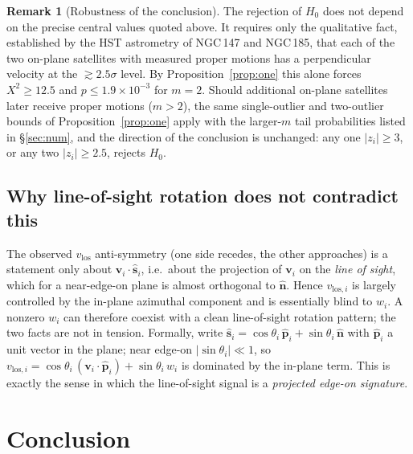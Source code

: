 \documentclass{amsart}
\theoremstyle{definition}
\newtheorem{remark}{Remark}
\begin{document}
\begin{remark}[Robustness of the conclusion]\label{rem:robust}
The rejection of $H_0$ does not depend on the precise central values quoted
above. It requires only the qualitative fact, established by the HST
astrometry of NGC\,147 and NGC\,185, that each of the two on-plane
satellites with measured proper motions has a perpendicular velocity at the
$\gtrsim 2.5\sigma$ level. By Proposition~\ref{prop:one} this alone forces
$X^2\ge 12.5$ and $p\le 1.9\times10^{-3}$ for $m=2$. Should additional
on-plane satellites later receive proper motions ($m>2$), the same
single-outlier and two-outlier bounds of Proposition~\ref{prop:one} apply
with the larger-$m$ tail probabilities listed in \S\ref{sec:num}, and the
direction of the conclusion is unchanged: any one $|z_i|\ge 3$, or any two
$|z_i|\ge 2.5$, rejects $H_0$.
\end{remark}

\subsection{Why line-of-sight rotation does not contradict this}
The observed $v_{\mathrm{los}}$ anti-symmetry (one side recedes, the other
approaches) is a statement only about
$\bm v_i\cdot\hat{\bm s}_i$, i.e.\ about the projection of $\bm v_i$ on the
\emph{line of sight}, which for a near-edge-on plane is almost orthogonal to
$\hat{\bm n}$. Hence $v_{\mathrm{los},i}$ is largely controlled by the
in-plane azimuthal component and is essentially blind to $w_i$. A nonzero
$w_i$ can therefore coexist with a clean line-of-sight rotation pattern; the
two facts are not in tension. Formally, write
$\hat{\bm s}_i=\cos\theta_i\,\hat{\bm p}_i+\sin\theta_i\,\hat{\bm n}$ with
$\hat{\bm p}_i$ a unit vector in the plane; near edge-on $|\sin\theta_i|\ll1$,
so
$v_{\mathrm{los},i}=\cos\theta_i\,(\bm v_i\cdot\hat{\bm p}_i)
+\sin\theta_i\,w_i$ is dominated by the in-plane term. This is exactly the
sense in which the line-of-sight signal is a \emph{projected edge-on
signature}.

\section{Conclusion}
\end{document}
